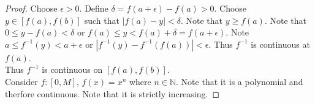 \documentclass[12pt]{article}
\theoremstyle{homework}
\begin{document}
\begin{proof}
Choose $\epsilon>0$.  Define $\delta=f(a+\epsilon)-f(a)>0$.  Choose $y\in [f(a), f(b)]$ such that $|f(a)-y|<\delta$.  Note that $y\geq f(a)$.  Note that $0 \leq y-f(a)<\delta$ or $f(a) \leq y<f(a)+\delta=f(a+\epsilon)$.  Note $a \leq f^{-1}(y)<a+\epsilon$ or $|f^{-1}(y)-f^{-1}(f(a))|<\epsilon$.  Thus $f^{-1}$ is continuous at $f(a)$.\\
Thus $f^{-1}$ is continuous on $[f(a),f(b)]$.\\
Consider $f:[0,M]$, $f(x)=x^n$ where $n\in\mathbb{N}$.  Note that it is a polynomial and therfore continuous.  Note that it is strictly increasing.
\end{proof}
\end{document}
